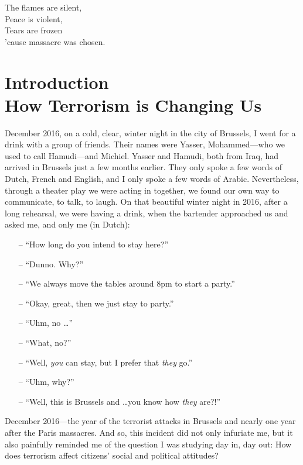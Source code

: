 \begin{savequote}[5cm]
The flames are silent,\\
Peace is violent,\\
Tears are frozen\\
’cause massacre was chosen.
\end{savequote}


\chapter[Introduction: How Terrorism Is Changing Us]{Introduction \\How Terrorism is Changing Us}
\label{chap:chap1}

\vspace{-5mm}
\lettrine[loversize=-0.2,lines=1]{D}{}ecember 2016, on a cold, clear, winter night in the city of Brussels, I went for a drink with a group of friends. Their names were Yasser, Mohammed—who we used to call Hamudi—and Michiel. Yasser and Hamudi, both from Iraq, had arrived in Brussels just a few months earlier. They only spoke a few words of Dutch, French and English, and I only spoke a few words of Arabic. Nevertheless, through a theater play we were acting in together, we found our own way to communicate, to talk, to laugh. On that beautiful winter night in 2016, after a long rehearsal, we were having a drink, when the bartender approached us and asked me, and only me (in Dutch):

\begin{itemize}[noitemsep]
    \item[--] ``How long do you intend to stay here?''
    \item[--] ``Dunno. Why?''
    \item[--] ``We always move the tables around 8pm to start a party.''
    \item[--] ``Okay, great, then we just stay to party.'' 
    \item[--] ``Uhm, no \dots''
    \item[--] ``What, no?''
    \item[--] ``Well, \textit{you} can stay, but I prefer that \textit{they} go.''
    \item[--] ``Uhm, why?''
    \item[--] ``Well, this is Brussels and \dots you know how \textit{they} are?!''
\end{itemize}
\newpage

December 2016---the year of the terrorist attacks in Brussels and nearly one year after the Paris massacres. And so, this incident did not only infuriate me, but it also painfully reminded me of the question I was studying day in, day out: How does terrorism affect citizens' social and political attitudes?


